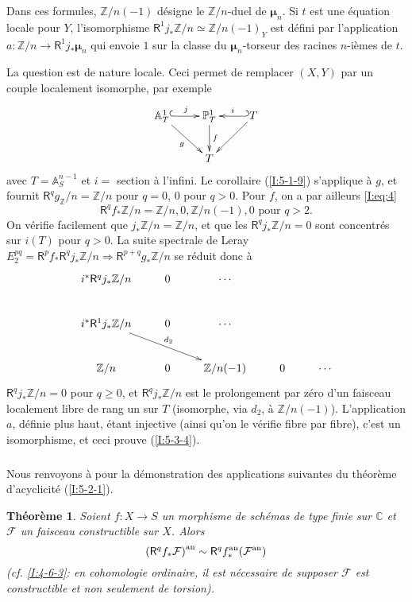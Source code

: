 \documentclass{book}
\newcommand{\cF}{\mathcal{F}}
\newcommand{\dA}{\mathbb{A}}
\newcommand{\dC}{\mathbb{C}}
\newcommand{\dmu}{{\bm\mu}}%
\newcommand{\dP}{\mathbb{P}}
\newcommand{\dZ}{\mathbb{Z}}
\newcommand{\an}[1]{{#1}^{\textnormal{an}}}
\newcommand{\R}{\mathsf{R}}
\newtheorem{theorem}[subsubsection]{Théorème}
\begin{document}
Dans ces formules, $\dZ/n(-1)$ désigne le $\dZ/n$-duel de $\dmu_n$. Si $t$ 
est une équation locale pour $Y$, l'isomorphisme 
$\R^1j_*\dZ/n\simeq\dZ/n(-1)_Y$ est défini par l'application 
$a:\dZ/n\to \R^1j_*\dmu_n$ qui envoie $1$ sur la classe du $\dmu_n$-torseur des 
racines $n$-ièmes de $t$. 

La question est de nature locale. Ceci permet de remplacer $(X,Y)$ par un 
couple localement isomorphe, par exemple 
\[\xymatrix{
  \dA_T^1 \ar@{^{(}->}[r]^-j \ar[dr]_-g 
    & \dP_T^1 \ar[d]^-f 
    & \ar@{_{(}->}[l]_-i T \ar[dl] \\
  & T
}\]
avec $T=\dA_S^{n-1}$ et $i=$ section à l'infini. Le corollaire (\ref{I:5-1-9}) 
s'applique à $g$, et fournit $\R^q g_ \dZ/n=\dZ/n$ pour $q=0$, $0$ pour $q>0$. 
Pour $f$, on a par ailleurs \eqref{I:eq:4}
\[
  \R^q f_* \dZ/n = \dZ/n,0,\dZ/n(-1),0 \text{ pour $q>2$.}
\]
On vérifie facilement que $j_* \dZ/n = \dZ/n$, et que les $\R^q j_*\dZ/n = 0$ 
sont concentrés sur $i(T)$ pour $q>0$. La suite spectrale de Leray 
$E_2^{pq} = \R^p f_* \R^q j_*\dZ/n \Rightarrow \R^{p+q}g_* \dZ/n$ se réduit 
donc à 
\[\xymatrix{
  i^* \R^q j_* \dZ/n & 0 & \cdots \\
  i^* \R^1 j_* \dZ/n \ar[drr]^-{d_2} & 0 & \cdots \\
  \dZ/n              & 0 & \dZ/n(-1) & 0 & \cdots
}\]
$\R^q j_*\dZ/n=0$ pour $q\geqslant 0$, et $\R^q j_*\dZ/n$ est le prolongement 
par zéro d'un faisceau localement libre de rang un sur $T$ (isomorphe, via 
$d_2$, à $\dZ/n(-1)$). L'application $a$, définie plus haut, étant 
injective (ainsi qu'on le vérifie fibre par fibre), c'est un isomorphisme, et 
ceci prouve (\ref{I:5-3-4}). 





\subsubsection{}\label{I:5-3-5}

Nous renvoyons à \cite[XVI.4,5]{4} pour la démonstration des 
applications suivantes du théorème d'acyclicité (\ref{I:5-2-1}). 





\begin{theorem}\label{I:5-3-6} %
Soient $f:X\to S$ un morphisme de schémas de type finie sur $\dC$ et $\cF$ un 
faisceau constructible sur $X$. Alors 
\[
  \an{(\R^q f_*\cF)} \sim \R^q \an f_* (\an\cF)
\]
(cf. \ref{I:4-6-3}: en cohomologie ordinaire, il est nécessaire de supposer 
$\cF$ est constructible et non seulement de torsion). 
\end{theorem}
\end{document}
